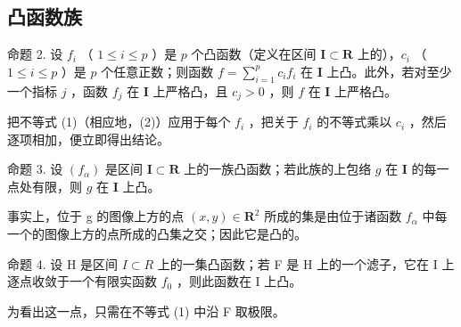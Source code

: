 \subsection{凸函数族}

命题 2. 设 \(f_{i}\) （ \(1 \leqslant i \leqslant p\) ）是 \(p\) 个凸函数（定义在区间 \(\mathbf{I} \subset \mathbf{R}\) 上的），\(c_{i}\) （ \(1 \leqslant i \leqslant p\) ）是 \(p\) 个任意正数；则函数 \(f = \sum_{i=1}^{p} c_{i} f_{i}\) 在 \(\mathbf{I}\) 上凸。此外，若对至少一个指标 \(j\) ，函数 \(f_{j}\) 在 \(\mathbf{I}\) 上严格凸，且 \(c_{j} > 0\) ，则 \(f\) 在 \(\mathbf{I}\) 上严格凸。

把不等式 (1)（相应地，(2)）应用于每个 \(f_{i}\) ，把关于 \(f_{i}\) 的不等式乘以 \(c_{i}\) ，然后逐项相加，便立即得出结论。

命题 3. 设 \((f_{\alpha})\) 是区间 \(\mathbf{I} \subset \mathbf{R}\) 上的一族凸函数；若此族的上包络 \(g\) 在 \(\mathbf{I}\) 的每一点处有限，则 \(g\) 在 \(\mathbf{I}\) 上凸。

事实上，位于 g 的图像上方的点 \((x, y) \in \mathbf{R}^{2}\) 所成的集是由位于诸函数 \(f_{\alpha}\) 中每一个的图像上方的点所成的凸集之交；因此它是凸的。

命题 4. 设 H 是区间 \(I \subset R\) 上的一集凸函数；若 F 是 H 上的一个滤子，它在 I 上逐点收敛于一个有限实函数 \(f_{0}\) ，则此函数在 I 上凸。

为看出这一点，只需在不等式 (1) 中沿 F 取极限。
\relax{}
